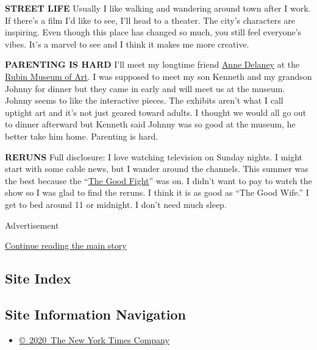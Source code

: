 \textbf{STREET LIFE} Usually I like walking and wandering around town
after I work. If there's a film I'd like to see, I'll head to a theater.
The city's characters are inspiring. Even though this place has changed
so much, you still feel everyone's vibes. It's a marvel to see and I
think it makes me more creative.

\textbf{PARENTING IS HARD} I'll meet my longtime friend
\href{https://www.annedelaney.com/}{Anne Delaney} at the
\href{https://rubinmuseum.org/}{Rubin Museum of Art}. I was supposed to
meet my son Kenneth and my grandson Johnny for dinner but they came in
early and will meet us at the museum. Johnny seems to like the
interactive pieces. The exhibits aren't what I call uptight art and it's
not just geared toward adults. I thought we would all go out to dinner
afterward but Kenneth said Johnny was so good at the museum, he better
take him home. Parenting is hard.

\textbf{RERUNS} Full disclosure: I love watching television on Sunday
nights. I might start with some cable news, but I wander around the
channels. This summer was the best because the
``\href{https://www.cbs.com/shows/the-good-fight/}{The Good Fight}'' was
on. I didn't want to pay to watch the show so I was glad to find the
reruns. I think it is as good as ``The Good Wife.'' I get to bed around
11 or midnight. I don't need much sleep.

Advertisement

\protect\hyperlink{after-bottom}{Continue reading the main story}

\hypertarget{site-index}{%
\subsection{Site Index}\label{site-index}}

\hypertarget{site-information-navigation}{%
\subsection{Site Information
Navigation}\label{site-information-navigation}}

\begin{itemize}
\tightlist
\item
  \href{https://help.nytimes.com/hc/en-us/articles/115014792127-Copyright-notice}{©~2020~The
  New York Times Company}
\end{itemize}

